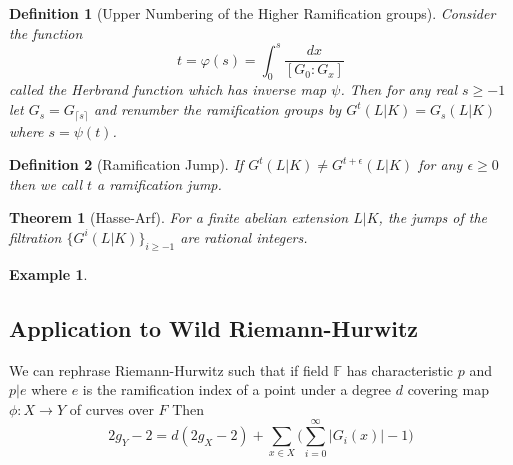 \documentclass[paper=a4, fontsize=11pt]{scrartcl} %
\numberwithin{equation}{section} %
\numberwithin{figure}{section} %
\numberwithin{table}{section} %
\theoremstyle{break}
\newtheorem{defn}{Definition}
\newtheorem{thm}{Theorem}
\newtheorem{ex}{Example}
\begin{document}
\begin{defn}[Upper Numbering of the Higher Ramification groups]
Consider the function
$$
t = \varphi(s) = \int_{0}^{s} \frac{dx}{[G_0 : G_x]}
$$
called the Herbrand function which has inverse map $\psi$.
Then for any real $s \geq -1$ let $G_s = G_{\lceil s \rceil}$ and renumber the ramification groups by $G^t(L|K) = G_s(L|K)$ where $s=\psi(t)$. 
\end{defn}
\begin{defn}[Ramification Jump]
If $G^{t}(L|K) \not=G^{t+\epsilon}(L|K)$ for any $\epsilon \geq 0$ then we call $t$ a ramification jump.
\end{defn}
\begin{thm}[Hasse-Arf]
For a finite abelian extension $L|K$, the jumps of the filtration $\{G^{i}(L|K)\}_{i \geq -1}$ are rational integers.
\end{thm}
\begin{ex}
\end{ex}

\subsection{Application to Wild Riemann-Hurwitz}
We can rephrase Riemann-Hurwitz such that if field $\mathbb{F}$ has characteristic $p$ and $p|e$ where $e$ is the ramification index of a point under a degree $d$ covering map $\phi:X \to Y$ of curves over $F$
Then
$$
2g_Y -2 = d(2g_X -2) + \sum_{x\in X} \big( \sum^{\infty}_{i=0}|G_i(x)| -1 \big)
$$
\nocite{*}
\printbibliography
\end{document}
